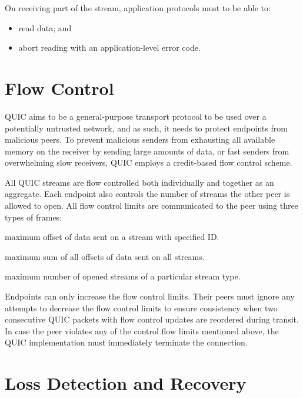 On receiving part of the stream, application protocols must to be able to:

\begin{itemize}

  \item read data; and

  \item abort reading with an application-level error code.

\end{itemize}

\section{Flow Control}

QUIC aims to be a general-purpose transport protocol to be used over a potentially untrusted
network, and as such, it needs to protect endpoints from malicious peers. To prevent malicious
senders from exhausting all available memory on the receiver by sending large amounts of data, or
fast senders from overwhelming slow receivers, QUIC employs a credit-based flow control scheme.

All QUIC streams are flow controlled both individually and together as an aggregate. Each endpoint
also controls the number of streams the other peer is allowed to open. All flow control limits are
communicated to the peer using three types of frames:

\begin{itemize}

\litem{\MAXSTREAMDATA{}} maximum offset of data sent on a stream with specified ID\@.

\litem{\MAXDATA{}} maximum sum of all offsets of data sent on all streams.

\litem{\MAXSTREAMS{}} maximum number of opened streams of a particular stream type.

\end{itemize}

Endpoints can only increase the flow control limits. Their peers must ignore any attempts to
decrease the flow control limits to ensure consistency when two consecutive QUIC packets with flow
control updates are reordered during transit. In case the peer violates any of the control flow
limits mentioned above, the QUIC implementation must immediately terminate the connection.

\section{Loss Detection and Recovery}

